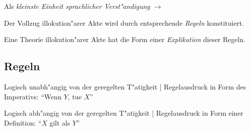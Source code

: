 \documentclass[emulatestandardclasses]{scrartcl}
\begin{document}
\begin{description}[leftmargin=!,labelwidth=\widthof{\bfseries Illokution"arer Akt}]
    \item[Illokution"arer Akt] Als \emph{kleinste Einheit sprachlicher Verst"andigung} $\rightarrow$ 
    \item[These] Der Vollzug illokution"arer Akte wird durch entsprechende \emph{Regeln} konstituiert. 
    \item[Idee] Eine Theorie illokution"arer Akte hat die Form einer \emph{Explikation} dieser Regeln. 
\end{description}

\subsection{Regeln}

\begin{description}[leftmargin=!,labelwidth=\widthof{\bfseries Konstitutive Regel}]
    \item[Regulative Regel] Logisch unabh"angig von der geregelten T"atigkeit | Regelausdruck in Form des Imperativs: "`Wenn $Y$, tue $X$"'
    \item[Konstitutive Regel] Logisch abh"angig von der geregelten T"atigkeit | Regelausdruck in Form einer Definition:  "`$X$ gilt als $Y$"'
\end{description}



\newpage
%
%

\end{document}

